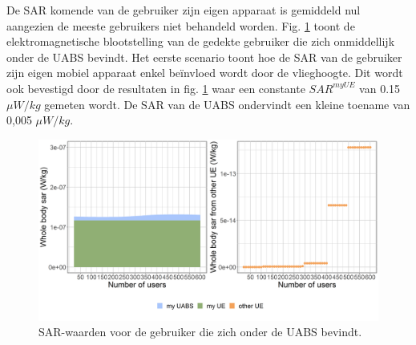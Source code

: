 \documentclass[twocolumn]{phdsymp_dutch}
\begin{document}
\FloatBarrier
De \gls{SAR} komende van de gebruiker zijn eigen apparaat is gemiddeld nul aangezien de meeste gebruikers niet behandeld worden.
Fig. \ref{fig:uvsulsarcentralUsers} toont de elektromagnetische blootstelling van de gedekte gebruiker die zich onmiddellijk onder de \gls{UABS} bevindt.
Het eerste scenario toont hoe de \gls{SAR} van de gebruiker zijn eigen mobiel apparaat enkel be\"invloed wordt door de vlieghoogte.
Dit wordt ook bevestigd door de resultaten in fig. \ref{fig:uvsulsarcentralUsers} waar een constante 
$SAR^{myUE}$ van 0.15 $\mu W/kg$ gemeten wordt.
De \gls{SAR} van de  \gls{UABS} ondervindt een kleine toename van 0,005  $\mu W/kg$.
\begin{figure}[h]
\centering
  \includegraphics[width=\linewidth]{../results/s2/uvsulsarcentralUser.png}
  \caption{SAR-waarden voor de gebruiker die zich onder de \acs{UABS} bevindt.}
  \label{fig:uvsulsarcentralUsers}
\end{figure}
\end{document}
